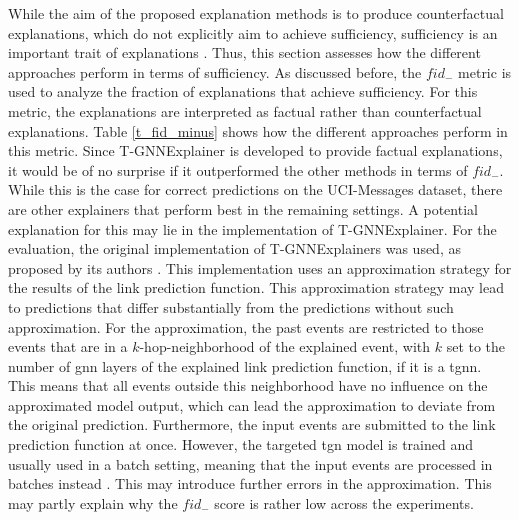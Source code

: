 While the aim of the proposed explanation methods is to produce counterfactual explanations, which do not explicitly aim to achieve sufficiency, sufficiency is an important trait of explanations \cite{tan_learning_2022}. Thus, this section assesses how the different approaches perform in terms of sufficiency. As discussed before, the $fid_-$ metric is used to analyze the fraction of explanations that achieve sufficiency. For this metric, the explanations are interpreted as factual rather than counterfactual explanations. Table \ref{t_fid_minus} shows how the different approaches perform in this metric. Since T-GNNExplainer is developed to provide factual explanations, it would be of no surprise if it outperformed the other methods in terms of $fid_-$. While this is the case for correct predictions on the UCI-Messages dataset, there are other explainers that perform best in the remaining settings. A potential explanation for this may lie in the implementation of T-GNNExplainer. For the evaluation, the original implementation of T-GNNExplainers was used, as proposed by its authors \cite{xia_explaining_2023}. This implementation uses an approximation strategy for the results of the link prediction function. This approximation strategy may lead to predictions that differ substantially from the predictions without such approximation. For the approximation, the past events are restricted to those events that are in a $k$-hop-neighborhood of the explained event, with $k$ set to the number of \gls{gnn} layers of the explained link prediction function, if it is a \gls{tgnn}. This means that all events outside this neighborhood have no influence on the approximated model output, which can lead the approximation to deviate from the original prediction. Furthermore, the input events are submitted to the link prediction function at once. However, the targeted \gls{tgn} model is trained and usually used in a batch setting, meaning that the input events are processed in batches instead \cite{rossi_temporal_2020}. This may introduce further errors in the approximation. This may partly explain why the $fid_-$ score is rather low across the experiments.

